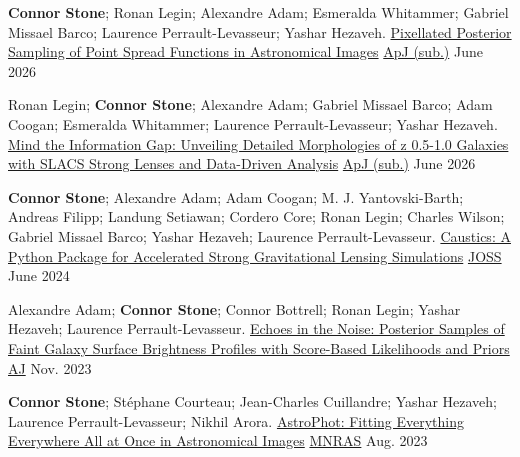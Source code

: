 \begin{cventries}

  \cvpublication
    {{\bf Connor Stone}; Ronan Legin; Alexandre Adam; Esmeralda Whitammer; Gabriel Missael Barco; Laurence Perrault-Levasseur; Yashar Hezaveh.} %
    {\href{https://scixplorer.org/abs/2025arXiv251119594S/abstract}{Pixellated Posterior Sampling of Point Spread Functions in Astronomical Images}} %
    {\href{https://journals.aas.org/astrophysical-journal/}{ApJ (sub.)}} %
    {June 2026} %

  \cvpublication
    {Ronan Legin; {\bf Connor Stone}; Alexandre Adam; Gabriel Missael Barco; Adam Coogan; Esmeralda Whitammer; Laurence Perrault-Levasseur; Yashar Hezaveh.} %
    {\href{https://scixplorer.org/abs/2025arXiv251119595L/abstract}{Mind the Information Gap: Unveiling Detailed Morphologies of z 0.5-1.0 Galaxies with SLACS Strong Lenses and Data-Driven Analysis}} %
    {\href{https://journals.aas.org/astrophysical-journal/}{ApJ (sub.)}} %
    {June 2026} %

  \cvpublication
    {{\bf Connor Stone}; Alexandre Adam; Adam Coogan; M. J. Yantovski-Barth; Andreas Filipp; Landung Setiawan; Cordero Core; Ronan Legin; Charles Wilson; Gabriel Missael Barco; Yashar Hezaveh; Laurence Perrault-Levasseur.} %
    {\href{https://ui.adsabs.harvard.edu/abs/2024arXiv240615542S/abstract}{Caustics: A Python Package for Accelerated Strong Gravitational Lensing Simulations}} %
    {\href{https://joss.theoj.org/}{JOSS}} %
    {June 2024} %

  \cvpublication
    {Alexandre Adam; {\bf Connor Stone}; Connor Bottrell; Ronan Legin; Yashar Hezaveh; Laurence Perrault-Levasseur.} %
    {\href{https://ui.adsabs.harvard.edu/abs/2023arXiv231118002A/abstract}{Echoes in the Noise: Posterior Samples of Faint Galaxy Surface Brightness Profiles with Score-Based Likelihoods and Priors}} %
    {\href{https://iopscience.iop.org/journal/1538-3881}{AJ}} %
    {Nov. 2023} %
    
  \cvpublication
    {{\bf Connor Stone}; St{\'e}phane Courteau; Jean-Charles Cuillandre; Yashar Hezaveh; Laurence Perrault-Levasseur; Nikhil Arora.} %
    {\href{https://ui.adsabs.harvard.edu/abs/2023MNRAS.tmp.2330S/abstract}{AstroPhot: Fitting Everything Everywhere All at Once in Astronomical Images}} %
    {\href{https://academic.oup.com/mnras}{MNRAS}} %
    {Aug. 2023} %
    

\end{cventries}
